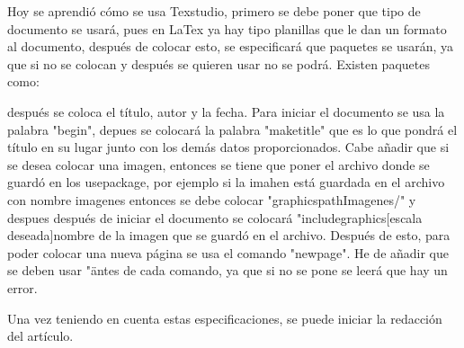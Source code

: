 \documentclass[letterpaper, 12pt,oneside]{article}
\begin{document}
	Hoy se aprendió cómo se usa Texstudio, primero se debe poner que tipo de documento se usará, pues en LaTex ya hay tipo planillas que le dan un formato al documento, después de colocar esto, se especificará que paquetes se usarán, ya que si no se colocan y después se quieren usar no se podrá. Existen paquetes como:

	después se coloca el título, autor y la fecha. Para iniciar el documento se usa la palabra "begin", depues se colocará la palabra "maketitle" que es lo que pondrá el título en su lugar junto con los demás datos proporcionados. Cabe añadir que si se desea colocar una imagen, entonces se tiene que poner el archivo donde se guardó en los usepackage, por ejemplo si la imahen está guardada en el archivo con nombre imagenes entonces se debe colocar "graphicspath{{Imagenes/}}" y despues después de iniciar el documento se colocará "includegraphics[escala deseada]{nombre de la imagen que se guardó en el archivo}. Después de esto, para poder colocar una nueva página se usa el comando "newpage". He de añadir que se deben usar "\" antes de cada comando, ya que si no se pone se leerá que hay un error. 
	
	Una vez teniendo en cuenta estas especificaciones, se puede iniciar la redacción del artículo. 
\end{document}
